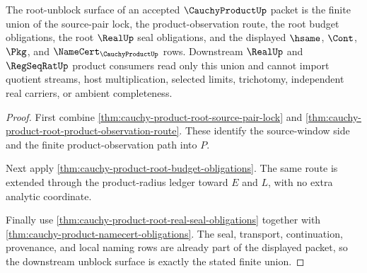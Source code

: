 \begin{theorem}
\label{thm:cauchy-product-root-downstream-unblock-surface}
The root-unblock surface of an accepted $\CauchyProductUp$ packet is the finite union of the source-pair lock, the product-observation route, the root budget obligations, the root $\RealUp$ seal obligations, and the displayed $\hsame$, $\Cont$, $\Pkg$, and $\NameCert_{\CauchyProductUp}$ rows. Downstream $\RealUp$ and $\RegSeqRatUp$ product consumers read only this union and cannot import quotient streams, host multiplication, selected limits, trichotomy, independent real carriers, or ambient completeness.
\end{theorem}
\begin{proof}
First combine \autoref{thm:cauchy-product-root-source-pair-lock} and \autoref{thm:cauchy-product-root-product-observation-route}. These identify the source-window side and the finite product-observation path into $P$.

Next apply \autoref{thm:cauchy-product-root-budget-obligations}. The same route is extended through the product-radius ledger toward $E$ and $L$, with no extra analytic coordinate.

Finally use \autoref{thm:cauchy-product-root-real-seal-obligations} together with \autoref{thm:cauchy-product-namecert-obligations}. The seal, transport, continuation, provenance, and local naming rows are already part of the displayed packet, so the downstream unblock surface is exactly the stated finite union.
\end{proof}

